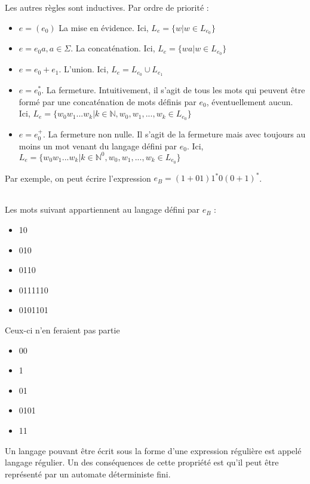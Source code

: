 Les autres règles sont inductives. Par ordre de priorité :
\begin{itemize}
	\item $e = (e_0)$ La mise en évidence. Ici, $L_e = \{w|w \in L_{e_0}\}$
	\item $e = e_0a, a \in \Sigma$. La concaténation. Ici, $L_e = \{wa|w \in L_{e_0}\}$ 
	\item $e = e_0+e_1$. L'union. Ici, $L_e = L_{e_0} \cup L_{e_1}$
	\item $e = e_0^*$. La fermeture. Intuitivement, il s'agit de tous les mots qui peuvent être formé par une concaténation de mots définis par $e_0$, éventuellement aucun. Ici, $L_e = \{w_0w_1...w_k | k \in \mathbb{N}, w_0,w_1,...,w_k \in L_{e_0}\}$
	\item $e = e_0^+$. La fermeture non nulle. Il s'agit de la fermeture mais avec toujours au moins un mot venant du langage défini par $e_0$. Ici, $L_e = \{w_0w_1...w_k | k \in \mathbb{N}^0, w_0,w_1,...,w_k \in L_{e_0}\}$
\end{itemize}
	
Par exemple, on peut écrire l'expression $e_B = (1+01)1^*0(0+1)^*$.\\

\\
\begin{minipage}{0.5\linewidth}
	Les mots suivant appartiennent au langage défini par $e_B$ :
	\begin{itemize}
		\item 10
		\item 010
		\item 0110
		\item 0111110
		\item 0101101
	\end{itemize}
\end{minipage}
\begin{minipage}{0.5\linewidth}
	Ceux-ci n'en feraient pas partie
	\begin{itemize}
		\item 00
		\item 1
		\item 01
		\item 0101
		\item 11
	\end{itemize}
\end{minipage}
	
Un langage pouvant être écrit sous la forme d'une expression régulière est appelé langage régulier. Un des conséquences de cette propriété est qu'il peut être représenté par un automate déterministe fini. 